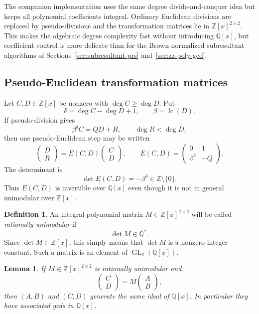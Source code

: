 \documentclass[11pt]{book}
\newtheorem{lemma}[theorem]{Lemma}
\theoremstyle{definition}
\newtheorem{definition}[theorem]{Definition}
\newcommand{\ZZ}{\mathbb Z}
\begin{document}
The companion implementation uses the same degree divide-and-conquer idea but
keeps all polynomial coefficients integral.  Ordinary Euclidean divisions are
replaced by pseudo-divisions and the transformation matrices lie in
$\ZZ[x]^{2\times2}$.  This makes the algebraic degree complexity fast without
introducing $\mathbb Q[x]$, but coefficient control is more delicate than for
the Brown-normalized subresultant algorithms of
Sections~\ref{sec:subresultant-prs} and~\ref{sec:zz-poly-gcd}.

\subsection{Pseudo-Euclidean transformation matrices}

Let $C,D\in\ZZ[x]$ be nonzero with $\deg C\ge\deg D$.  Put
\[
 \delta=\deg C-\deg D+1,
 \qquad
 \beta=\operatorname{lc}(D).
\]
If pseudo-division gives
\begin{equation}\label{eq:hgcd-pseudodiv}
 \beta^\delta C=QD+R,
 \qquad \deg R<\deg D,
\end{equation}
then one pseudo-Euclidean step may be written
\begin{equation}\label{eq:hgcd-step-matrix}
 \begin{pmatrix}D\\R\end{pmatrix}
 =
 E(C,D)
 \begin{pmatrix}C\\D\end{pmatrix},
 \qquad
 E(C,D)=
 \begin{pmatrix}
  0&1\\
  \beta^\delta&-Q
 \end{pmatrix}.
\end{equation}
The determinant is
\[
 \det E(C,D)=-\beta^\delta\in\ZZ\setminus\{0\}.
\]
Thus $E(C,D)$ is invertible over $\mathbb Q[x]$ even though it is not in
general unimodular over $\ZZ[x]$.

\begin{definition}
An integral polynomial matrix
$M\in\ZZ[x]^{2\times2}$ will be called \emph{rationally unimodular} if
\[
 \det M\in\mathbb Q^*.
\]
Since $\det M\in\ZZ[x]$, this simply means that $\det M$ is a nonzero integer
constant.  Such a matrix is an element of $\operatorname{GL}_2(\mathbb Q[x])$.
\end{definition}

\begin{lemma}\label{lem:hgcd-matrix-preserves-gcd}
If $M\in\ZZ[x]^{2\times2}$ is rationally unimodular and
\[
 \begin{pmatrix}C\\D\end{pmatrix}
 =M\begin{pmatrix}A\\B\end{pmatrix},
\]
then $(A,B)$ and $(C,D)$ generate the same ideal of $\mathbb Q[x]$.  In
particular they have associated gcds in $\mathbb Q[x]$.
\end{lemma}
\end{document}
